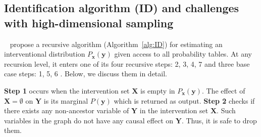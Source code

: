 \documentclass{article}
\newcommand{\red}{\textcolor{red}}
\newcommand{\x}{\mathbf{x}}
\newcommand{\y}{\mathbf{y}}
\newcommand{\X}{\mathbf{X}}
\newcommand{\Y}{\mathbf{Y}}
\newcommand{\vb}{\mathbf{v}}
\newcommand{\mbf}{\mathbf}
\newcommand{\idgen}{\text{ID-GEN}\xspace}
\newcommand{\ydox}{P_{\mathbf{x}}(\mathbf{y})\xspace}
\theoremstyle{plain}
\theoremstyle{definition}
\theoremstyle{remark}
\begin{document}
\subsection{ 
 Identification algorithm (ID)
 and challenges with high-dimensional sampling  }
\label{sec:id-alg}
%
~\citet{shpitser2008complete} propose a recursive algorithm (Algorithm~\ref{alg:ID}) for estimating an interventional distribution $P_{\x}(\y)$ given access to all probability tables.
  At any recursion level, it enters one of its four recursive steps: 2, 3, 4, 7 and three base case steps: 1, 5, 6 . Below, we discuss them in detail.
\par
\textbf{Step 1} 
occurs when the intervention set $\mbf{X}$
is empty in $\ydox$. The effect of $\X=\emptyset$ on $\mbf{Y}$ is its marginal $P(\mbf{y})$ which is returned as output.
%
%
\textbf{Step 2} checks if there exists any non-ancestor variable of $\Y$ in the intervention set $\X$. Such variables in the graph do not have any causal effect on $\Y$. Thus, it is safe to drop them.
\end{document}
